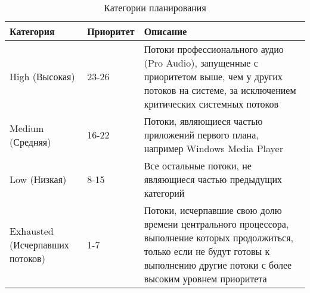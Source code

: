 \begin{table}[h]
    \caption{Категории планирования}
    \begin{center}
        \begin{tabular}{|p{40mm}|p{30mm}|p{80mm}|}
            \hline
            \textbf{Категория} & \textbf{Приоритет} & \textbf{Описание} \\
            \hline
            High (Высокая) & 23-26 & Потоки профессионального аудио (Pro
Audio), запущенные с приоритетом выше, чем у других потоков на системе, за
исключением критических системных потоков \\
            \hline
            Medium (Средняя) & 16-22 & Потоки, являющиеся частью приложений
первого плана, например Windows Media Player \\
            \hline
            Low (Низкая) & 8-15 & Все остальные потоки, не являющиеся частью
предыдущих категорий \\
            \hline
            Exhausted (Исчерпавших потоков) & 1-7 & Потоки, исчерпавшие свою
долю времени центрального процессора, выполнение которых продолжиться, только
если не будут готовы к выполнению другие потоки с более высоким уровнем
приоритета \\
            \hline
        \end{tabular}
    \end{center}
    \label{tab:category}
\end{table}